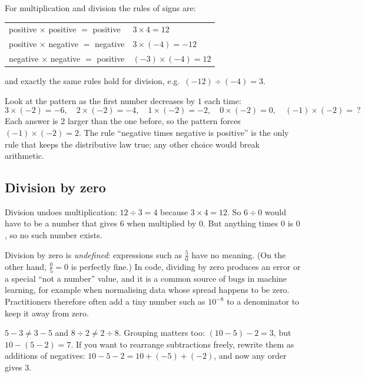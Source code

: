 For multiplication and division the rules of signs are:
\begin{center}
\renewcommand{\arraystretch}{1.2}
\begin{tabular}{@{}ll@{}}
\toprule
positive $\times$ positive $=$ positive & \quad $3 \times 4 = 12$\\
positive $\times$ negative $=$ negative & \quad $3 \times (-4) = -12$\\
negative $\times$ negative $=$ positive & \quad $(-3) \times (-4) = 12$\\
\bottomrule
\end{tabular}
\end{center}
and exactly the same rules hold for division, e.g.\ $(-12) \div (-4) = 3$.

\begin{intuition}
Look at the pattern as the first number decreases by $1$ each time:
\[
  3 \times (-2) = -6,\quad 2 \times (-2) = -4,\quad 1\times(-2) = -2,\quad
  0 \times (-2) = 0,\quad (-1)\times(-2) = \ ?
\]
Each answer is $2$ larger than the one before, so the pattern forces
$(-1)\times(-2) = 2$. The rule ``negative times negative is positive'' is the
only rule that keeps the distributive law true; any other choice would break
arithmetic.
\end{intuition}

\subsection{Division by zero}

Division undoes multiplication: $12 \div 3 = 4$ because $3 \times 4 = 12$. So
$6 \div 0$ would have to be a number that gives $6$ when multiplied by $0$. But
anything times $0$ is $0$, so no such number exists.

\begin{pitfall}
Division by zero is \emph{undefined}: expressions such as $\tfrac{5}{0}$ have
no meaning. (On the other hand, $\tfrac{0}{5} = 0$ is perfectly fine.) In
code, dividing by zero produces an error or a special ``not a number'' value,
and it is a common source of bugs in machine learning, for example when
normalising data whose spread happens to be zero. Practitioners therefore often
add a tiny number such as $10^{-8}$ to a denominator to keep it away from zero.
\end{pitfall}

\begin{pitfall}
$5 - 3 \neq 3 - 5$ and $8 \div 2 \neq 2 \div 8$. Grouping matters too:
$(10 - 5) - 2 = 3$, but $10 - (5 - 2) = 7$. If you want to rearrange
subtractions freely, rewrite them as additions of negatives:
$10 - 5 - 2 = 10 + (-5) + (-2)$, and now any order gives $3$.
\end{pitfall}

